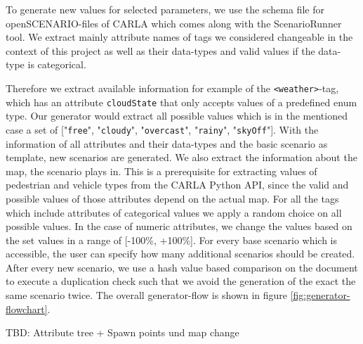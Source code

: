 \documentclass[conference, 11pt]{IEEEtran}
\begin{document}
To generate new values for selected parameters, we use the schema file for openSCENARIO-files of CARLA which comes along with the ScenarioRunner tool. We extract mainly attribute names of tags we considered changeable in the context of this project as well as their data-types and valid values if the data-type is categorical.

 Therefore we extract available information for example of the \texttt{<weather>}-tag, which has an attribute \texttt{cloudState} that only accepts values of a predefined enum type. Our generator would extract all possible values which is in the mentioned case a set of ["\texttt{free}", "\texttt{cloudy}", "\texttt{overcast}", "\texttt{rainy}", "\texttt{skyOff}"]. With the information of all attributes and their data-types and the basic scenario as template, new scenarios are generated. We also extract the information about the map, the scenario plays in. This is a prerequisite for extracting values of pedestrian and vehicle types from the CARLA Python API, since the valid and possible values of those attributes depend on the actual map.
 For all the tags which include attributes of categorical values we apply a random choice on all possible values. In the case of numeric attributes, we change the values based on the set values in a range of [-100\%, +100\%].
 For every base scenario which is accessible, the user can specify how many additional scenarios should be created. After every new scenario, we use a hash value based comparison on the document to execute a duplication check such that we avoid the generation of the exact the same scenario twice.
The overall generator-flow is shown in figure \ref{fig:generator-flowchart}.

TBD:
 Attribute tree 
+ Spawn points und map change
\end{document}
